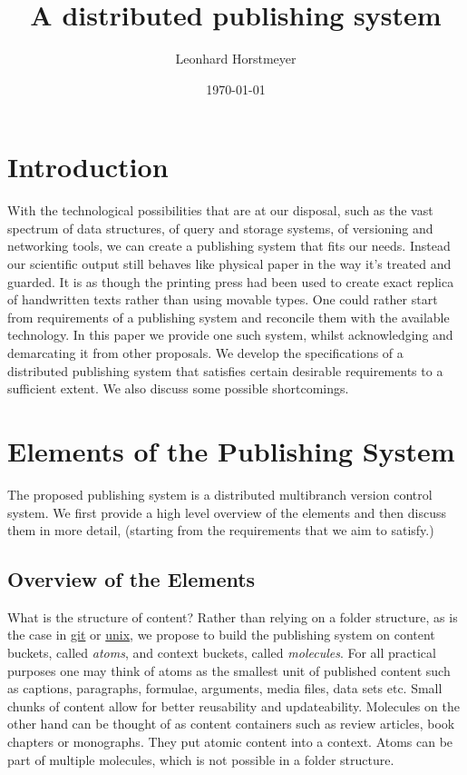 \documentclass[14pt]{article}
\title{A distributed publishing system}
\author{Leonhard Horstmeyer}
\date{\today}
\newcommand{\remark}[1]{{\color{purple} (#1)}}
\begin{document}
\maketitle

\begin{abstract}
    
\end{abstract}
\section{Introduction}

With the technological possibilities that are at our disposal, such as the vast spectrum of data structures, of query and storage systems, of versioning and networking tools, we can create a publishing system that fits our needs. Instead our scientific output still behaves like physical paper in the way it's treated and guarded. It is as though the printing press had been used to create exact replica of handwritten texts rather than using movable types. One could rather start from requirements of a publishing system and reconcile them with the available technology. In this paper we provide one such system, whilst acknowledging and demarcating it from other proposals. We develop the specifications of a distributed publishing system that satisfies certain desirable requirements to a sufficient extent. We also discuss some possible shortcomings.


\section{Elements of the Publishing System}

The proposed publishing system is a distributed multibranch version control system. We first provide a high level overview of the elements and then discuss them in more detail, \remark{starting from the requirements that we aim to satisfy.}

\subsection{Overview of the Elements}



What is the structure of content? Rather than relying on a folder structure, as is the case in \href{https://git-scm.com/}{git}\cite{torwalds} or \href{https://en.wikipedia.org/wiki/Unix_filesystem}{unix}\cite{unix}, we propose to build the publishing system on content buckets, called \textit{atoms}, and context buckets, called \textit{molecules}. For all practical purposes one may think of atoms as the smallest unit of published content such as captions, paragraphs, formulae, arguments, media files, data sets etc. Small chunks of content allow for better reusability and updateability. Molecules on the other hand can be thought of as content containers such as review articles, book chapters or monographs. They put atomic content into a context. Atoms can be part of multiple molecules, which is not possible in a folder structure.
\end{document}
